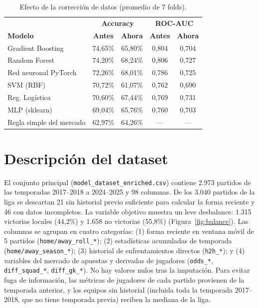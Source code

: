 \documentclass[12pt,letterpaper,oneside]{report}
\begin{document}
\begin{table}[!htbp]
\caption[Efecto de la corrección de datos (promedio de 7 folds)]{Efecto de la corrección de datos (promedio de 7 folds).}
\label{tab:antes_despues}
\centering
\footnotesize
\setlength{\tabcolsep}{2.5pt}
\begin{tabular}{@{}lcccc@{}}
\toprule
 & \multicolumn{2}{c}{\textbf{Accuracy}} & \multicolumn{2}{c}{\textbf{ROC-AUC}} \\
\textbf{Modelo} & \textbf{Antes} & \textbf{Ahora} & \textbf{Antes} & \textbf{Ahora} \\
\midrule
Gradient Boosting & 74,65\% & 65,80\% & 0,804 & 0,704 \\
Random Forest & 74,20\% & 68,24\% & 0,806 & 0,727 \\
Red neuronal PyTorch & 72,26\% & 68,01\% & 0,786 & 0,725 \\
SVM (RBF) & 70,72\% & 61,07\% & 0,762 & 0,690 \\
Reg. Logística & 70,60\% & 67,44\% & 0,769 & 0,731 \\
MLP (sklearn) & 69,04\% & 65,76\% & 0,760 & 0,703 \\
\midrule
Regla simple del mercado & 62,97\% & 64,26\% & --- & --- \\
\bottomrule
\end{tabular}
\par{}
\end{table}

\section{Descripción del dataset}
El conjunto principal (\texttt{model\_dataset\_enriched.csv}) contiene 2.973 partidos de las temporadas 2017--2018 a 2024--2025 y 98 columnas. De los 3.040 partidos de la liga se descartan 21 sin historial previo suficiente para calcular la forma reciente y 46 con datos incompletos. La variable objetivo muestra un leve desbalance: 1.315 victorias locales (44,2\%) y 1.658 no victorias (55,8\%) (Figura~\ref{fig:balance}). Las columnas se agrupan en cuatro categorías: (1) forma reciente en ventana móvil de 5 partidos (\texttt{home/away\_roll\_*}); (2) estadísticas acumuladas de temporada (\texttt{home/away\_season\_*}); (3) historial de enfrentamientos directos (\texttt{h2h\_*}); y (4) variables del mercado de apuestas y derivadas de jugadores (\texttt{odds\_*}, \texttt{diff\_squad\_*}, \texttt{diff\_gk\_*}). No hay valores nulos tras la imputación. Para evitar fuga de información, las métricas de jugadores de cada partido provienen de la temporada anterior, y los equipos sin historial (incluida toda la temporada 2017--2018, que no tiene temporada previa) reciben la mediana de la liga.
\end{document}

